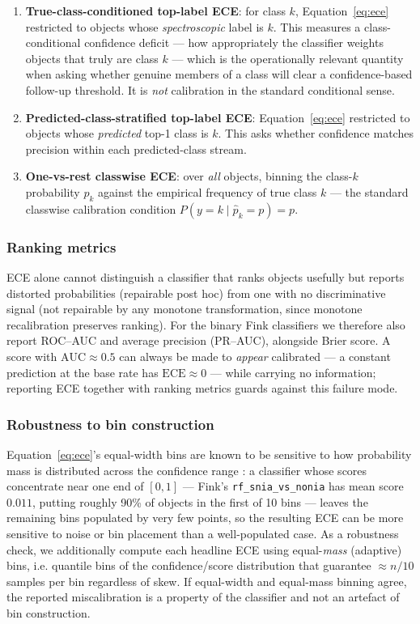 \begin{enumerate}
\item \textbf{True-class-conditioned top-label ECE}: for class $k$,
Equation~\ref{eq:ece} restricted to objects whose \emph{spectroscopic}
label is $k$. This measures a class-conditional confidence deficit —
how appropriately the classifier weights objects that truly are class
$k$ — which is the operationally relevant quantity when asking whether
genuine members of a class will clear a confidence-based follow-up
threshold. It is \emph{not} calibration in the standard conditional
sense.
\item \textbf{Predicted-class-stratified top-label ECE}:
Equation~\ref{eq:ece} restricted to objects whose \emph{predicted}
top-1 class is $k$. This asks whether confidence matches precision
within each predicted-class stream.
\item \textbf{One-vs-rest classwise ECE}: over \emph{all} objects,
binning the class-$k$ probability $p_k$ against the empirical
frequency of true class $k$ — the standard classwise calibration
condition $P(y = k \mid \hat{p}_k = p) = p$.
\end{enumerate}

\subsubsection{Ranking metrics}
\label{sec:methods:ranking}

ECE alone cannot distinguish a classifier that ranks objects usefully
but reports distorted probabilities (repairable post hoc) from one
with no discriminative signal (not repairable by any monotone
transformation, since monotone recalibration preserves ranking). For
the binary Fink classifiers we therefore also report ROC--AUC and
average precision (PR--AUC), alongside Brier score. A score with
$\mathrm{AUC} \approx 0.5$ can always be made to \emph{appear}
calibrated — a constant prediction at the base rate has
$\mathrm{ECE} \approx 0$ — while carrying no information; reporting
ECE together with ranking metrics guards against this failure mode.

\subsubsection{Robustness to bin construction}
\label{sec:methods:ace}

Equation~\ref{eq:ece}'s equal-width bins are known to be sensitive
to how probability mass is distributed across the confidence range
\citep{Nixon2019, Roelofs2022}: a classifier whose scores concentrate
near one end of $[0,1]$ — Fink's \texttt{rf\_snia\_vs\_nonia} has mean
score $0.011$, putting roughly 90\% of objects in the first of 10
bins — leaves the remaining bins populated by very few points, so the
resulting ECE can be more sensitive to noise or bin placement than a
well-populated case. As a robustness check, we additionally compute
each headline ECE using equal-\textit{mass} (adaptive) bins, i.e.
quantile bins of the confidence/score distribution that guarantee
$\approx n/10$ samples per bin regardless of skew. If equal-width and
equal-mass binning agree, the reported miscalibration is a property
of the classifier and not an artefact of bin construction.

